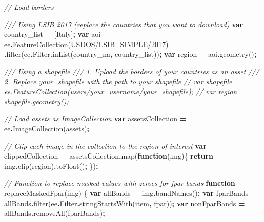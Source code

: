 \documentclass[
  10pt,
  b5paper,
  oneside]{book}
\newenvironment{Shaded}{\begin{snugshade}}{\end{snugshade}}
\newcommand{\AttributeTok}[1]{\textcolor[rgb]{0.77,0.63,0.00}{#1}}
\newcommand{\CommentTok}[1]{\textcolor[rgb]{0.56,0.35,0.01}{\textit{#1}}}
\newcommand{\ControlFlowTok}[1]{\textcolor[rgb]{0.13,0.29,0.53}{\textbf{#1}}}
\newcommand{\FunctionTok}[1]{\textcolor[rgb]{0.00,0.00,0.00}{#1}}
\newcommand{\KeywordTok}[1]{\textcolor[rgb]{0.13,0.29,0.53}{\textbf{#1}}}
\newcommand{\NormalTok}[1]{#1}
\newcommand{\OperatorTok}[1]{\textcolor[rgb]{0.81,0.36,0.00}{\textbf{#1}}}
\newcommand{\StringTok}[1]{\textcolor[rgb]{0.31,0.60,0.02}{#1}}
\begin{document}
\begin{Shaded}
\begin{Highlighting}[]
\CommentTok{// Load borders }

\CommentTok{/// Using LSIB 2017 (replace the countries that you want to download)}
\KeywordTok{var}\NormalTok{ country\_list }\OperatorTok{=}\NormalTok{ [}\StringTok{\textquotesingle{}Italy\textquotesingle{}}\NormalTok{]}\OperatorTok{;}
\KeywordTok{var}\NormalTok{ aoi }\OperatorTok{=}\NormalTok{ ee}\OperatorTok{.}\FunctionTok{FeatureCollection}\NormalTok{(}\StringTok{\textquotesingle{}USDOS/LSIB\_SIMPLE/2017\textquotesingle{}}\NormalTok{)}
  \OperatorTok{.}\FunctionTok{filter}\NormalTok{(ee}\OperatorTok{.}\AttributeTok{Filter}\OperatorTok{.}\FunctionTok{inList}\NormalTok{(}\StringTok{\textquotesingle{}country\_na\textquotesingle{}}\OperatorTok{,}\NormalTok{ country\_list))}\OperatorTok{;}
\KeywordTok{var}\NormalTok{ region }\OperatorTok{=}\NormalTok{ aoi}\OperatorTok{.}\FunctionTok{geometry}\NormalTok{()}\OperatorTok{;}

\CommentTok{/// Using a shapefile}
\CommentTok{/// 1. Upload the borders of your countries as an asset}
\CommentTok{/// 2. Replace \textquotesingle{}your\_shapefile\textquotesingle{} with the path to your shapefile}
\CommentTok{// var shapefile = ee.FeatureCollection(\textquotesingle{}users/your\_username/your\_shapefile\textquotesingle{});}
\CommentTok{// var region = shapefile.geometry();}


\CommentTok{// Load assets as ImageCollection}
\KeywordTok{var}\NormalTok{ assetsCollection }\OperatorTok{=}\NormalTok{ ee}\OperatorTok{.}\FunctionTok{ImageCollection}\NormalTok{(assets)}\OperatorTok{;}

\CommentTok{// Clip each image in the collection to the region of interest}
\KeywordTok{var}\NormalTok{ clippedCollection }\OperatorTok{=}\NormalTok{ assetsCollection}\OperatorTok{.}\FunctionTok{map}\NormalTok{(}\KeywordTok{function}\NormalTok{(img)\{}
  \ControlFlowTok{return}\NormalTok{ img}\OperatorTok{.}\FunctionTok{clip}\NormalTok{(region)}\OperatorTok{.}\FunctionTok{toFloat}\NormalTok{()}\OperatorTok{;}
\NormalTok{\})}\OperatorTok{;}

\CommentTok{// Function to replace masked values with zeroes for fpar bands}
\KeywordTok{function} \FunctionTok{replaceMaskedFpar}\NormalTok{(img) \{}
  \KeywordTok{var}\NormalTok{ allBands }\OperatorTok{=}\NormalTok{ img}\OperatorTok{.}\FunctionTok{bandNames}\NormalTok{()}\OperatorTok{;}
  \KeywordTok{var}\NormalTok{ fparBands }\OperatorTok{=}\NormalTok{ allBands}\OperatorTok{.}\FunctionTok{filter}\NormalTok{(ee}\OperatorTok{.}\AttributeTok{Filter}\OperatorTok{.}\FunctionTok{stringStartsWith}\NormalTok{(}\StringTok{\textquotesingle{}item\textquotesingle{}}\OperatorTok{,} \StringTok{\textquotesingle{}fpar\textquotesingle{}}\NormalTok{))}\OperatorTok{;}
  \KeywordTok{var}\NormalTok{ nonFparBands }\OperatorTok{=}\NormalTok{ allBands}\OperatorTok{.}\FunctionTok{removeAll}\NormalTok{(fparBands)}\OperatorTok{;}
  

\end{Highlighting}
\end{Shaded}
\end{document}
